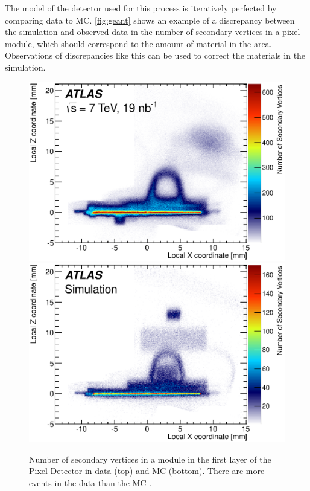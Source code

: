 The model of the detector used for this process is iteratively perfected by comparing data to \ac{MC}. \autoref{fig:geant} shows an example of a discrepancy between the simulation and observed data in the number of secondary vertices in a pixel module, which should correspond to the amount of material in the area. Observations of discrepancies like this can be used to correct the materials in the simulation. 

\begin{centering}
\begin{figure}[!hbt]
\myfloatalign
\includegraphics[width=.9\linewidth]{figures/theory/fig_10a.eps}
\includegraphics[width=.9\linewidth]{figures/theory/fig_10b.eps}
\caption{Number of secondary vertices in a module in the first layer of the Pixel Detector in data (top) and \ac{MC} (bottom). There are more events in the data than the \ac{MC} \cite{PERF-2015-06}.}
\label{fig:geant}
\end{figure}
\end{centering}

